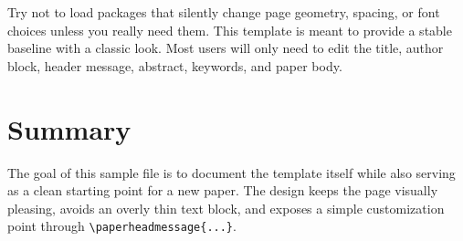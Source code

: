\documentclass{article} %
\begin{document}
Try not to load packages that silently change page geometry, spacing, or font
choices unless you really need them. This template is meant to provide a stable
baseline with a classic look. Most users will only need to edit the title,
author block, header message, abstract, keywords, and paper body.

\section{Summary}

The goal of this sample file is to document the template itself while also
serving as a clean starting point for a new paper. The design keeps the page
visually pleasing, avoids an overly thin text block, and exposes a simple
customization point through \verb|\paperheadmessage{...}|.

\renewcommand{\refname}{Bibliography}


\end{document}
